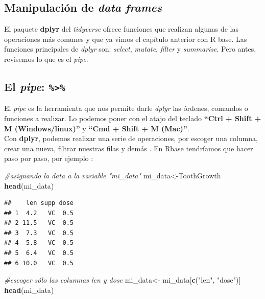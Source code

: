 \documentclass[
]{book}
\newenvironment{Shaded}{\begin{snugshade}}{\end{snugshade}}
\newcommand{\CommentTok}[1]{\textcolor[rgb]{0.56,0.35,0.01}{\textit{#1}}}
\newcommand{\FunctionTok}[1]{\textcolor[rgb]{0.13,0.29,0.53}{\textbf{#1}}}
\newcommand{\NormalTok}[1]{#1}
\newcommand{\OtherTok}[1]{\textcolor[rgb]{0.56,0.35,0.01}{#1}}
\newcommand{\StringTok}[1]{\textcolor[rgb]{0.31,0.60,0.02}{#1}}
\begin{document}
\subsection{\texorpdfstring{Manipulación de \emph{data frames}}{Manipulación de data frames}}\label{manipulaciuxf3n-de-data-frames}

El paquete \textbf{dplyr} del \emph{tidyverse} ofrece funciones que realizan algunas de las operaciones más comunes y que ya vimos el capítulo anterior con R base.
Las funciones principales de \emph{dplyr} son: \emph{select}, \emph{mutate}, \emph{filter} y \emph{summarise}.
Pero antes, revisemos lo que es el \emph{pipe}.

\subsection{\texorpdfstring{El \emph{pipe}: \texttt{\%\textgreater{}\%}}{El pipe: \%\textgreater\%}}\label{el-pipe}

\hfill\break
El \emph{pipe} es la herramienta que nos permite darle \emph{dplyr} las órdenes, comandos o funciones a realizar.
Lo podemos poner con el atajo del teclado \textbf{``Ctrl + Shift + M (Windows/linux)''} y \textbf{``Cmd + Shift + M (Mac)''}.\\
Con \textbf{dplyr}, podemos realizar una serie de operaciones, por escoger una columna, crear una nueva, filtrar nuestras filas y demás
. En Rbase tendríamos que hacer paso por paso, por ejemplo
:\\

\begin{Shaded}
\begin{Highlighting}[]
\CommentTok{\#asignando la data a la variable "mi\_data"}
\NormalTok{mi\_data}\OtherTok{\textless{}{-}}\NormalTok{ToothGrowth}
\FunctionTok{head}\NormalTok{(mi\_data)}
\end{Highlighting}
\end{Shaded}

\begin{verbatim}
##    len supp dose
## 1  4.2   VC  0.5
## 2 11.5   VC  0.5
## 3  7.3   VC  0.5
## 4  5.8   VC  0.5
## 5  6.4   VC  0.5
## 6 10.0   VC  0.5
\end{verbatim}

\begin{Shaded}
\begin{Highlighting}[]
\CommentTok{\#escoger sólo las columnas len y dose}
\NormalTok{mi\_data}\OtherTok{\textless{}{-}}\NormalTok{ mi\_data[}\FunctionTok{c}\NormalTok{(}\StringTok{"len"}\NormalTok{, }\StringTok{"dose"}\NormalTok{)]}
\FunctionTok{head}\NormalTok{(mi\_data)}
\end{Highlighting}
\end{Shaded}
\end{document}
